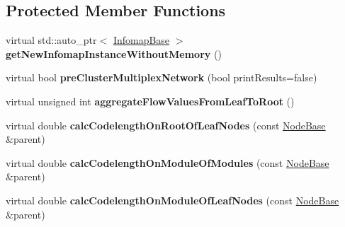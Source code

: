 \subsection*{Protected Member Functions}
\begin{DoxyCompactItemize}
\item 
\mbox{\label{classInfomapGreedyTypeSpecialized_3_01FlowType_00_01WithMemory_01_4_af784da3d085139461da37195a499a0d6}} 
virtual std\+::auto\+\_\+ptr$<$ \mbox{\hyperlink{classInfomapBase}{Infomap\+Base}} $>$ {\bfseries get\+New\+Infomap\+Instance\+Without\+Memory} ()
\item 
\mbox{\label{classInfomapGreedyTypeSpecialized_3_01FlowType_00_01WithMemory_01_4_af256d7fbcede47c289ac5523283fc836}} 
virtual bool {\bfseries pre\+Cluster\+Multiplex\+Network} (bool print\+Results=false)
\item 
\mbox{\label{classInfomapGreedyTypeSpecialized_3_01FlowType_00_01WithMemory_01_4_a9dec24f211a79e1672d581bf1ddca828}} 
virtual unsigned int {\bfseries aggregate\+Flow\+Values\+From\+Leaf\+To\+Root} ()
\item 
\mbox{\label{classInfomapGreedyTypeSpecialized_3_01FlowType_00_01WithMemory_01_4_a9cc197eb97a00d1dd39ce72bb7432749}} 
virtual double {\bfseries calc\+Codelength\+On\+Root\+Of\+Leaf\+Nodes} (const \mbox{\hyperlink{classNodeBase}{Node\+Base}} \&parent)
\item 
\mbox{\label{classInfomapGreedyTypeSpecialized_3_01FlowType_00_01WithMemory_01_4_aa4bebdd9c7932541bfa0b49466786c55}} 
virtual double {\bfseries calc\+Codelength\+On\+Module\+Of\+Modules} (const \mbox{\hyperlink{classNodeBase}{Node\+Base}} \&parent)
\item 
\mbox{\label{classInfomapGreedyTypeSpecialized_3_01FlowType_00_01WithMemory_01_4_aaf98cc0c3514fb23645747627ca8da83}} 
virtual double {\bfseries calc\+Codelength\+On\+Module\+Of\+Leaf\+Nodes} (const \mbox{\hyperlink{classNodeBase}{Node\+Base}} \&parent)

\end{DoxyCompactItemize}
